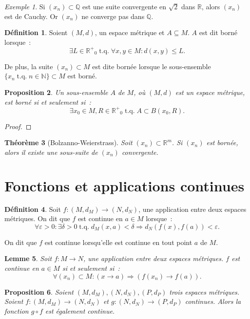 \documentclass{report}
\newtheorem{thm}{Théorème}[section]
\newtheorem{prp}[thm]{Proposition}
\newtheorem{lem}[thm]{Lemme}
\theoremstyle{definition}
\newtheorem{déf}[thm]{Définition}
\theoremstyle{remark}
\newtheorem{ex}{Exemple}[section]
\DeclareMathOperator{\tq}{\text{ t.q. }}
\newcommand{\R}{\mathbb R}
\newcommand{\Rp}{{\R^+}}
\newcommand{\Q}{\mathbb Q}
\newcommand{\N}{\mathbb N}
\begin{document}
		\begin{ex} Si $(x_n) \subset \Q$ est une suite convergente en $\sqrt 2$ dans $\R$, alors $(x_n)$ est de Cauchy. Or $(x_n)$ ne converge pas dans $\Q$.
		\end{ex}

		\begin{déf} Soient $(M, d)$, un espace métrique et $A \subseteq M$. $A$ est dit borné lorsque~:
		\[\exists L \in \Rp_0 \tq \forall x, y \in M : d(x, y) \leq L.\]

		De plus, la suite $(x_n) \subset M$ est dite bornée lorsque le sous-ensemble $\{x_n \tq n \in \N\} \subset M$ est borné.
		\end{déf}

		\begin{prp} Un sous-ensemble $A$ de $M$, où $(M, d)$ est un espace métrique, est borné si et seulement si~:
		\[\exists x_0 \in M, R \in \Rp_0 \tq A \subset B(x_0, R).\]
		\end{prp}

		\begin{proof}  %
		\end{proof}

		\begin{thm}[Bolzanno-Weierstrass] Soit $(x_n) \subset \R^m$. Si $(x_n)$ est bornée, alors il existe une sous-suite de $(x_n)$ convergente.
		\end{thm}

	\section{Fonctions et applications continues}
		\begin{déf} Soit $f : (M, d_M) \to (N, d_N)$, une application entre deux espaces métriques. On dit que $f$ est continue en $a \in M$ lorsque~:
		\[\forall \varepsilon > 0 : \exists \delta > 0 \tq d_M(x, a) < \delta \Rightarrow d_N(f(x), f(a)) < \varepsilon.\]

		On dit que $f$ est continue lorsqu'elle est continue en tout point $a$ de $M$.
		\end{déf}

		\begin{lem} Soit $f : M \to N$, une application entre deux espaces métriques. $f$ est continue en $a \in M$ si et seulement si~:
		\[\forall (x_n) \subset M : \left(x \to a\right) \Rightarrow \left(f(x_n) \to f(a)\right).\]
		\end{lem}

		\begin{prp} Soient $(M, d_M), (N, d_N), (P, d_P)$ trois espaces métriques. Soient $f : (M, d_M) \to (N, d_N)$ et $g : (N, d_N) \to (P, d_P)$ continues.
		Alors la fonction $g \circ f$ est également continue.
		\end{prp}
\end{document}
